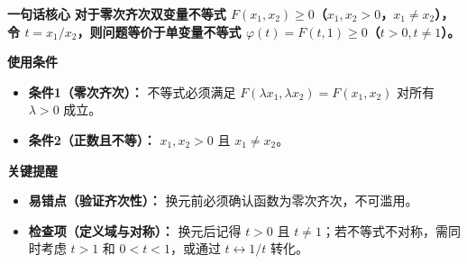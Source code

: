 \begin{summarybox}
	\textbf{\textcolor{CSummary}{一句话核心}}
	\textbf{对于零次齐次双变量不等式 $F(x_1,x_2)\ge0$（$x_1,x_2>0$，$x_1\neq x_2$），令 $t=x_1/x_2$，则问题等价于单变量不等式 $\varphi(t)=F(t,1)\ge0$（$t>0,t\neq1$）。}

	\medskip
	\textbf{\textcolor{CSummary}{使用条件}}
	\begin{itemize}[leftmargin=*, itemsep=0.5em, topsep=0.4em]
		\item \textbf{条件1（零次齐次）：} 不等式必须满足 $F(\lambda x_1,\lambda x_2)=F(x_1,x_2)$ 对所有 $\lambda>0$ 成立。
		\item \textbf{条件2（正数且不等）：} $x_1,x_2>0$ 且 $x_1\neq x_2$。
	\end{itemize}

	\medskip
	\textbf{\textcolor{CSummary}{关键提醒}}
	\begin{itemize}[leftmargin=*, itemsep=0.5em, topsep=0.4em]
		\item \textbf{易错点（验证齐次性）：} 换元前必须确认函数为零次齐次，不可滥用。
		\item \textbf{检查项（定义域与对称）：} 换元后记得 $t>0$ 且 $t\neq1$；若不等式不对称，需同时考虑 $t>1$ 和 $0<t<1$，或通过 $t\leftrightarrow 1/t$ 转化。
	\end{itemize}

\end{summarybox}
